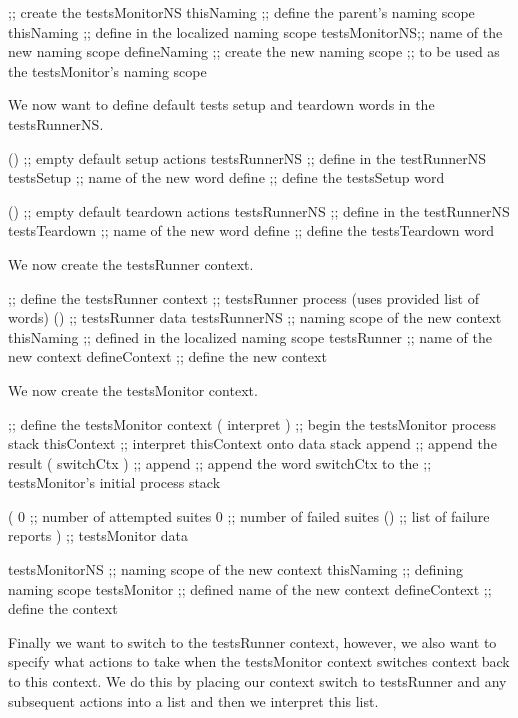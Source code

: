 \startJoylolCode
  ;; create the testsMonitorNS
  thisNaming    ;; define the parent's naming scope
  thisNaming    ;; define in the localized naming scope
  testsMonitorNS;; name of the new naming scope
  defineNaming  ;; create the new naming scope
                ;; to be used as the testsMonitor's naming scope
\stopJoylolCode

We now want to define default tests setup and teardown words in the 
testsRunnerNS. 

\startJoylolCode
  ()            ;; empty default setup actions
  testsRunnerNS ;; define in the testRunnerNS
  testsSetup    ;; name of the new word
  define        ;; define the testsSetup word
\stopJoylolCode

\startJoylolCode
  ()            ;; empty default teardown actions
  testsRunnerNS ;; define in the testRunnerNS
  testsTeardown ;; name of the new word
  define        ;; define the testsTeardown word
\stopJoylolCode

We now create the testsRunner context.

\startJoylolCode
  ;; define the testsRunner context
                ;; testsRunner process (uses provided list of words)
  ()            ;; testsRunner data
  testsRunnerNS ;; naming scope of the new context
  thisNaming    ;; defined in the localized naming scope
  testsRunner   ;; name of the new context
  defineContext ;; define the new context
\stopJoylolCode

We now create the testsMonitor context.

\startJoylolCode
  ;; define the testsMonitor context
  ( interpret )   ;; begin the testsMonitor process stack
  thisContext     ;; interpret thisContext onto data stack
  append          ;; append the result
  ( switchCtx )   ;;
  append          ;; append the word switchCtx to the
                  ;; testsMonitor's initial process stack
  
  (
    0             ;; number of attempted suites
    0             ;; number of failed suites
    ()            ;; list of failure reports
  )               ;; testsMonitor data
  
  testsMonitorNS  ;; naming scope of the new context
  thisNaming      ;; defining naming scope
  testsMonitor    ;; defined name of the new context
  defineContext   ;; define the context
\stopJoylolCode

Finally we want to switch to the testsRunner context, however, we also 
want to specify what actions to take when the testsMonitor context 
switches context back to this context. We do this by placing our context 
switch to testsRunner and any subsequent actions into a list and then we 
interpret this list. 

